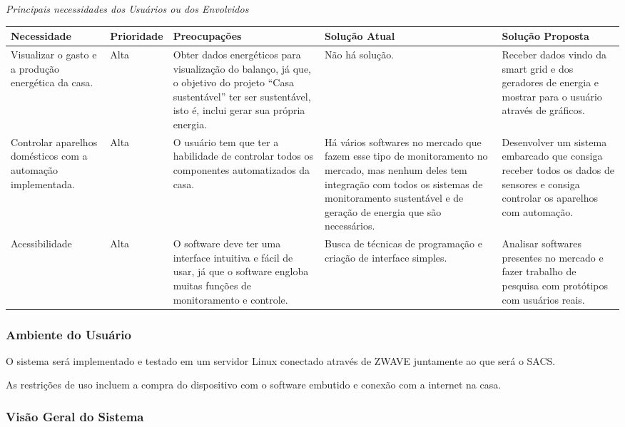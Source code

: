 \textit{Principais necessidades dos Usuários ou dos Envolvidos}

\begin{longtable}{|m{2.75cm}|m{2cm}|m{3cm}|m{4cm}|m{4cm}|}
	\hline \textbf{Necessidade} & \textbf{Prioridade} & \textbf{Preocupações} & \textbf{Solução Atual} & \textbf{Solução
	 Proposta}\\
	\hline
Visualizar o gasto e a produção energética da casa.
&
Alta
&
Obter dados energéticos para visualização do balanço, já que, o objetivo do projeto “Casa sustentável” ter ser
sustentável, isto é, inclui gerar sua própria energia.
&
Não há solução.
&
Receber dados vindo da smart grid e dos geradores de energia e mostrar para o usuário através de gráficos.
\\
	\hline
Controlar aparelhos domésticos com a automação implementada.
&
Alta
&
O usuário tem que ter a habilidade de controlar todos os componentes automatizados da casa.
&
Há vários softwares no mercado que fazem esse tipo de monitoramento no mercado, mas nenhum deles tem integração com
todos os sistemas de monitoramento sustentável e de geração de energia que são necessários.
&
Desenvolver um sistema embarcado que consiga receber todos os dados de sensores e consiga controlar os aparelhos com
automação.
\\
	\hline
Acessibilidade
&
Alta
&
O software deve ter uma interface intuitiva e fácil de usar, já que o software engloba muitas funções de monitoramento
e controle.
&
Busca de técnicas de programação e criação de interface simples.
&
Analisar softwares presentes no mercado e fazer trabalho de pesquisa com protótipos com usuários reais.
\\
	\hline
\end{longtable}

\subsubsection{Ambiente do Usuário}

	O sistema será implementado e testado em um servidor Linux conectado através de ZWAVE juntamente ao que será o SACS.

	As restrições de uso incluem a compra do dispositivo com o software embutido e conexão com a internet na casa.

\subsubsection{Visão Geral do Sistema}

